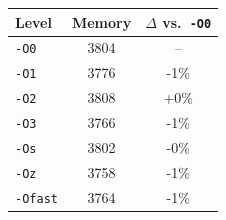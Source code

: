\begin{tabular*}{\columnwidth}{@{\extracolsep\fill}lcc@{\extracolsep\fill}}
\toprule
\textbf{Level} & \textbf{Memory} & \textbf{$\Delta$ vs.\ \texttt{-O0}} \\
\midrule
\texttt{-O0} & 3804 & -- \\
\texttt{-O1} & 3776 & -1\% \\
\texttt{-O2} & 3808 & +0\% \\
\texttt{-O3} & 3766 & -1\% \\
\texttt{-Os} & 3802 & -0\% \\
\texttt{-Oz} & 3758 & -1\% \\
\texttt{-Ofast} & 3764 & -1\% \\
\bottomrule
\end{tabular*}
